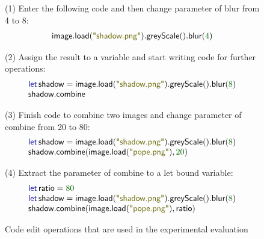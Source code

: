 \documentclass[english,crc,references=cleveref]{programming}
\theoremstyle{plain}
\theoremstyle{definition}
\newcommand{\Num}[1]{\num[color=numclr]{#1}}
\newcommand{\str}[1]{\textnormal{\textcolor{strclr}{\sffamily "#1"}}}
\newcommand{\ident}[1]{\textnormal{\textcolor{idclr}{\sffamily #1}}}
\newcommand{\kvd}[1]{\textnormal{\textcolor{kvdclr}{\sffamily #1}}}
\begin{document}

\begin{figure}
\raggedright
%
{\sffamily (1) Enter the following code and then change parameter of blur from 4 to 8:}
%
\begin{equation*}
\begin{array}{l}
\ident{image}.\ident{load}(\str{shadow.png}).\ident{greyScale}().\ident{blur}(\Num{4})
\end{array}
\end{equation*}

{\sffamily (2) Assign the result to a variable and start writing code for further operations:}
%
\begin{equation*}
\begin{array}{l}
\kvd{let}\,\ident{shadow}=\ident{image}.\ident{load}(\str{shadow.png}).\ident{greyScale}().\ident{blur}(\Num{8})\\
\ident{shadow}.\ident{combine}
\end{array}
\end{equation*}

{\sffamily (3) Finish code to combine two images and change parameter of combine from 20 to 80:}
%
\begin{equation*}
\begin{array}{l}
\kvd{let}\,\ident{shadow}=\ident{image}.\ident{load}(\str{shadow.png}).\ident{greyScale}().\ident{blur}(\Num{8})\\
\ident{shadow}.\ident{combine}(\ident{image}.\ident{load}(\str{pope.png}), \Num{20})
\end{array}
\end{equation*}

{\sffamily (4) Extract the parameter of combine to a let bound variable:}
%
\begin{equation*}
\begin{array}{l}
\kvd{let}\,\ident{ratio} = \Num{80} \\
\kvd{let}\,\ident{shadow}=\ident{image}.\ident{load}(\str{shadow.png}).\ident{greyScale}().\ident{blur}(\Num{8})\\
\ident{shadow}.\ident{combine}(\ident{image}.\ident{load}(\str{pope.png}), \ident{ratio})
\end{array}
\end{equation*}
%
\caption{Code edit operations that are used in the experimental evaluation}
\label{fig:image-edits}
%
\end{figure}
\end{document}
